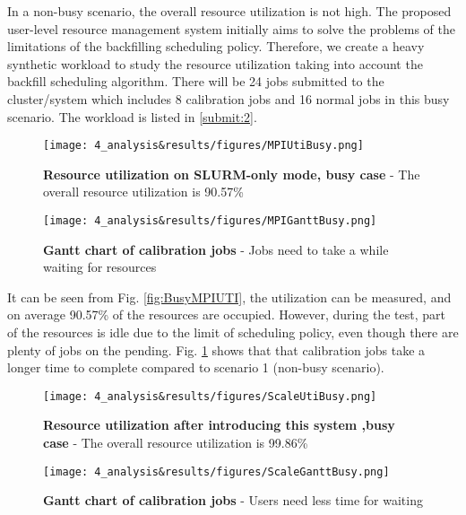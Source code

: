 In a non-busy scenario, the overall resource utilization is not high.
The proposed user-level resource management system initially aims to solve the problems of the limitations of the backfilling scheduling policy.
Therefore, we create a heavy synthetic workload to study the resource utilization taking into account the backfill scheduling algorithm.
There will be 24 jobs submitted to the cluster/system which includes 8 calibration jobs and 16 normal jobs in this busy scenario. The workload is listed in \ref{submit:2}.
\begin{figure}
    \centering
    \begin{minipage}{.48\textwidth}
      \centering
      \texttt{[image: 4\_analysis\&results/figures/MPIUtiBusy.png]}
      \caption[Resource utilization on SLURM-only mode, busy case]{{\small\textbf{Resource utilization on SLURM-only mode, busy case} - The overall resource utilization is 90.57\%}}
      \label{fig:BusyMPIUTI}
    \end{minipage} 
    \begin{minipage}{.48\textwidth}
      \centering
      \texttt{[image: 4\_analysis\&results/figures/MPIGanttBusy.png]}
      \caption[Gantt chart of calibration jobs]{{\small\textbf{Gantt chart of calibration jobs} - Jobs need to take a while waiting for resources}}
      \label{fig:BusyMPIgantt}
    \end{minipage}
\end{figure}
It can be seen from Fig. \ref{fig:BusyMPIUTI}, the utilization can be measured, and on average 90.57\% of the resources are occupied.
However, during the test, part of the resources is idle due to the limit of scheduling policy, even though there are plenty of jobs on the pending.
Fig. \ref{fig:BusyMPIgantt} shows that that calibration jobs take a longer time to complete compared to scenario 1 (non-busy scenario).



\begin{figure}[h]
    \centering
    \begin{minipage}{.48\textwidth}
      \centering
      \texttt{[image: 4\_analysis\&results/figures/ScaleUtiBusy.png]}
      \caption[Resource utilization after introducing this system ,busy case]{{\small\textbf{Resource utilization after introducing this system ,busy case} - The overall resource utilization is 99.86\%}}
      \label{fig:BusyScaleUTI}
    \end{minipage} 
    \begin{minipage}{.48\textwidth}
      \centering
      \texttt{[image: 4\_analysis\&results/figures/ScaleGanttBusy.png]}
      \caption[Gantt chart of calibration jobs]{{\small\textbf{Gantt chart of calibration jobs} - Users need less time for waiting}}
      \label{fig:BusyScalegantt}
    \end{minipage}
\end{figure}

